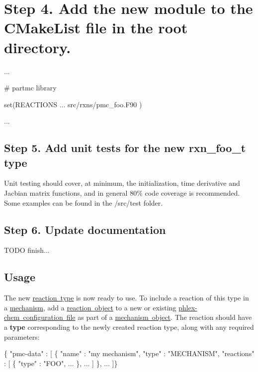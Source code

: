 \section*{Step 4. Add the new module to the C\+Make\+List file in the root directory.}


\begin{DoxyCode}
...

# partmc library

set(REACTIONS 
    ...
    src/rxns/pmc\_foo.F90
)

...
\end{DoxyCode}


\subsection*{Step 5. Add unit tests for the new {\ttfamily rxn\+\_\+foo\+\_\+t} type}

Unit testing should cover, at minimum, the initialization, time derivative and Jacbian matrix functions, and in general 80\% code coverage is recommended. Some examples can be found in the {\ttfamily /src/test} folder.

\subsection*{Step 6. Update documentation}

T\+O\+DO finish...

\subsection*{Usage}

The new \mbox{\hyperlink{phlex_rxn}{reaction type}} is now ready to use. To include a reaction of this type in a \mbox{\hyperlink{phlex_mechanism}{mechanism}}, add a \mbox{\hyperlink{input_format_rxn}{reaction object}} to a new or existing \mbox{\hyperlink{input_format_phlex_config}{phlex-\/chem configuration file}} as part of a \mbox{\hyperlink{input_format_mechanism}{mechanism object}}. The reaction should have a {\bfseries type} corresponding to the newly created reaction type, along with any required parameters\+:


\begin{DoxyCode}
\{ "pmc-data" : [
  \{
    "name" : "my mechanism",
    "type" : "MECHANISM",
    "reactions" : [
      \{
        "type" : "FOO",
        ...
      \},
      ...
    ]
  \},
  ...
]\}
\end{DoxyCode}
 